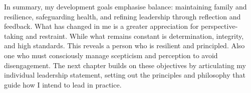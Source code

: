 \noindent
In summary, my development goals emphasise balance: maintaining family and resilience,  safeguarding health, and refining leadership through reflection and feedback. What has changed in me is a greater appreciation for perspective-taking and restraint. While what remains constant is determination, integrity, and high standards.  This reveals a person who is resilient and principled. Also one who must consciously manage scepticism and perception to avoid disengagement. The next chapter builds on these objectives by articulating my individual leadership statement, setting out the principles and philosophy that guide how I intend to lead in practice.
